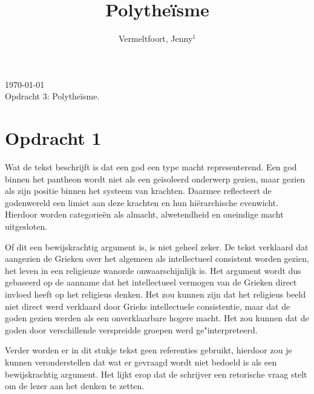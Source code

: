 \documentclass[10pt]{amsart}
\begin{document}
\setcounter{page}{1}

\hfill     {\small \today} \\
{\small Opdracht 3: Polythe\"isme.}\hfill
{\small } %

\centerline{}

\centerline{}

\title[Polythe\"isme]{Polythe\"isme}

\author[J. Vermeltfoort]{Vermeltfoort, Jenny$^1$}

\address{$^{1}$ 3787494, Faculteit Geesteswetenschappen, Leiden
     Universiteit, Leiden, Nederland.}
\email{\textcolor[rgb]{0.00,0.00,0.84}{j.vermeltfoort@umail.leidenuniv.nl}}

\maketitle

\section*{Opdracht 1}

\noindent Wat de tekst beschrijft is dat een god een type macht representerend. Een god binnen het pantheon wordt niet als een geïsoleerd onderwerp gezien, maar gezien als zijn positie binnen het systeem van krachten. Daarmee reflecteert de godenwereld een limiet aan deze krachten en hun hiërarchische evenwicht. Hierdoor worden categorieën als almacht, alwetendheid en oneindige macht uitgesloten. \autocite{vernantGreceAncienneEtude1976}

Of dit een bewijskrachtig argument is, is niet geheel zeker. De tekst verklaard dat aangezien de Grieken over het
algemeen als intellectueel consistent worden gezien, het leven in een religieuze wanorde onwaarschijnlijk is. Het
argument wordt dus gebaseerd op de aanname dat het intellectueel vermogen van de Grieken direct invloed heeft op het
religieus denken. Het zou kunnen zijn dat het religieus beeld niet direct werd verklaard door Grieks intellectuele
consistentie, maar dat de goden gezien werden als een onverklaarbare hogere macht. Het zou kunnen dat de goden door
verschillende verspreidde groepen werd ge"interpreteerd.

Verder worden er in dit stukje tekst geen referenties gebruikt, hierdoor zou je kunnen veronderstellen dat wat er
gevraagd wordt niet bedoeld is als een bewijskrachtig argument. Het lijkt erop dat de schrijver een retorische vraag
stelt om de lezer aan het denken te zetten.
\end{document}
